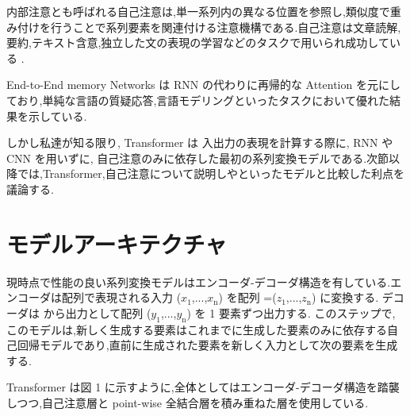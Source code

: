 \documentclass{jarticle}     %
\begin{document}
内部注意とも呼ばれる自己注意は,単一系列内の異なる位置を参照し,類似度で重み付けを行うことで系列要素を関連付ける注意機構である.自己注意は文章読解,要約,テキスト含意,独立した文の表現の学習などのタスクで用いられ成功している \cite{4,22,23,19}.\par

End-to-End memory Networks は RNN の代わりに再帰的な Attention を元にしており,単純な言語の質疑応答,言語モデリングといったタスクにおいて優れた結果を示している\cite{28}.\par

しかし私達が知る限り, Transformer は 入出力の表現を計算する際に, RNN や CNN を用いずに, 自己注意のみに依存した最初の系列変換モデルである.次節以降では,Transformer,自己注意について説明し\cite{14,15}や\cite{8}といったモデルと比較した利点を議論する.




\section{モデルアーキテクチャ}
現時点で性能の良い系列変換モデルはエンコーダ-デコーダ構造を有している.\cite{5,2,29}エンコーダは配列で表現される入力 ($x_\mathrm{1}$,...,$x_\mathrm{n}$) を配列 =($z_\mathrm{1}$,...,$z_\mathrm{n}$) に変換する.
デコーダは  から出力として配列 ($y_\mathrm{1}$,...,$y_\mathrm{n}$) を 1 要素ずつ出力する.
このステップで,このモデルは,新しく生成する要素はこれまでに生成した要素のみに依存する自己回帰モデル\cite{自己回帰モデル,9}であり,直前に生成された要素を新しく入力として次の要素を生成する.\par
Transformer は図 1 に示すように,全体としてはエンコーダ-デコーダ構造を踏襲しつつ,自己注意層と point-wise 全結合層を積み重ねた層を使用している.
\end{document}
